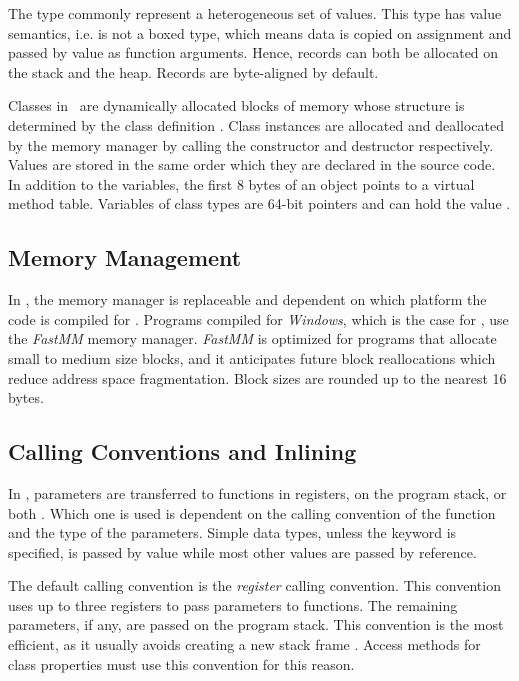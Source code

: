 The  type commonly represent a heterogeneous set of values. This type has value semantics, i.e. is not a boxed type, which means data is copied on assignment and passed by value as function arguments. Hence, records can both be allocated on the stack and the heap. Records are byte-aligned by default.

Classes in \delphi~are dynamically allocated blocks of memory whose structure is determined by the class definition \cite{noauthor_undated-un}. Class instances are allocated and deallocated by the memory manager by calling the constructor and destructor respectively. Values are stored in the same order which they are declared in the source code. In addition to the variables, the first 8 bytes of an object points to a virtual method table. Variables of class types are 64-bit pointers and can hold the value . 

\subsection{Memory Management}
\label{sub:Memory Management}
In \delphi, the memory manager is replaceable and dependent on which platform the code is compiled for \cite{noauthor_undated-ys}. Programs compiled for \textit{Windows}, which is the case for \gap, use the \textit{FastMM} memory manager. \textit{FastMM} is optimized for programs that allocate small to medium size blocks, and it anticipates future block reallocations which reduce address space fragmentation. Block sizes are rounded up to the nearest 16 bytes. 

\subsection{Calling Conventions and Inlining}
\label{sub:Calling Conventions and Inlining}
In \delphi, parameters are transferred to functions in registers, on the program stack, or both \cite{noauthor_undated-xi}. Which one is used is dependent on the calling convention of the function and the type of the parameters. Simple data types, unless the  keyword is specified, is passed by value while most other values are passed by reference.

The default calling convention is the \textit{register} calling convention. This convention uses up to three registers to pass parameters to functions. The remaining parameters, if any, are passed on the program stack. This convention is the most efficient, as it usually avoids creating a new stack frame \cite{noauthor_undated-xi}. Access methods for class properties must use this convention for this reason.

